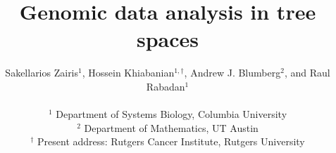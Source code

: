 \documentclass[a4paper,11pt]{article}
\begin{document}
\title{Genomic data analysis in tree spaces}

\author{Sakellarios Zairis$^{1}$, Hossein Khiabanian$^{1,\dagger}$, Andrew J. Blumberg$^{2}$, and Raul Rabadan$^{1}$\\
\\
$^1$ Department of Systems Biology, Columbia University\\
$^2$ Department of Mathematics, UT Austin\\
$^\dagger$ Present address: Rutgers Cancer Institute, Rutgers University\\}
\maketitle


\end{document}
